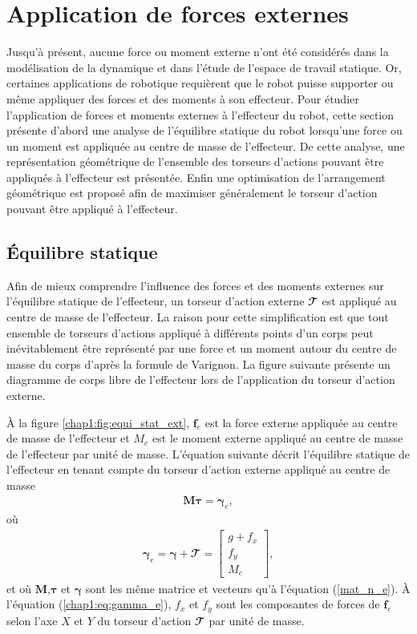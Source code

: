 \section{Application de forces externes}
Jusqu'à présent, aucune force ou moment externe n'ont été considérés dans la modélisation de la dynamique et dans l'étude de l'espace de travail statique. Or, certaines applications de robotique requièrent que le robot puisse supporter ou même appliquer des forces et des moments à son effecteur. Pour étudier l'application de forces et moments externes à l'effecteur du robot, cette section présente d'abord une analyse de l'équilibre statique du robot lorsqu'une force ou un moment est appliquée au centre de masse de l'effecteur. De cette analyse, une représentation géométrique de l'ensemble des torseurs d'actions pouvant être appliqués à l'effecteur est présentée. Enfin une optimisation de l'arrangement géométrique est proposé afin de maximiser généralement le torseur d'action pouvant être appliqué à l'effecteur.\par 
\subsection{Équilibre statique}
Afin de mieux comprendre l'influence des forces et des moments externes sur l'équilibre statique de l'effecteur, un torseur d'action externe $\mathbfcal{T}$ est appliqué au centre de masse de l'effecteur. La raison pour cette simplification est que tout ensemble de torseurs d'actions appliqué à différents points d'un corps peut inévitablement être représenté par une force et un moment autour du centre de masse du corps d'après la formule de Varignon. La figure suivante présente un diagramme de corps libre de l'effecteur lors de l'application du torseur d'action externe.

À la figure \ref{chap1:fig:equi_stat_ext}, $\mathbf{f}_e$ est la force externe appliquée au centre de masse de l'effecteur et $M_e$ est le moment externe appliqué au centre de masse de l'effecteur par unité de masse. L'équation suivante décrit l'équilibre statique de l'effecteur en tenant compte du torseur d'action externe appliqué au centre de masse 
\begin{align}
\mathbf{M}\bm{\tau}=\bm{\gamma}_e \label{chap1:eq:mat_n_e_ext},
\end{align}
où 
\begin{align}
\bm{\gamma}_e = \bm{\gamma}+\mathbfcal{T}=
\begin{bmatrix}
g+f_x \\ f_y \\ M_e
\end{bmatrix},\label{chap1:eq:gamma_e}
\end{align}
et où $\mathbf{M}$,$\bm{\tau}$ et $\bm{\gamma}$ sont les même matrice et vecteurs qu'à l'équation (\ref{mat_n_e}). À l'équation (\ref{chap1:eq:gamma_e}), $f_x$ et $f_y$ sont les composantes de forces de $\mathbf{f}_e$ selon l'axe $X$ et $Y$ du torseur d'action $\mathbfcal{T}$ par unité de masse. \par
